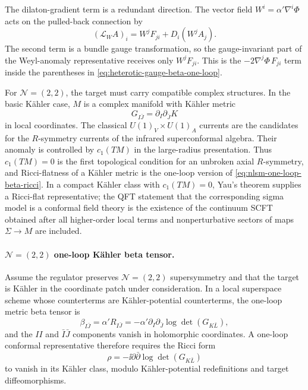 The dilaton-gradient term is a redundant direction.  The vector field
\(W^i=\alpha'\nabla^i\Phi\) acts on the pulled-back connection by
\[
  (\mathcal L_WA)_i
  =
  W^jF_{ji}+D_i(W^jA_j).
\]
The second term is a bundle gauge transformation, so the gauge-invariant
part of the Weyl-anomaly representative receives only \(W^jF_{ji}\).  This
is the \(-2\nabla^j\Phi\,F_{ji}\) term inside the parentheses in
\eqref{eq:heterotic-gauge-beta-one-loop}.

For \(\mathcal N=(2,2)\), the target must carry compatible complex structures.
In the basic K\"ahler case, \(M\) is a complex manifold with K\"ahler metric
\[
  G_{I\bar J}=\partial_I\partial_{\bar J}K
\]
in local coordinates.  The classical \(U(1)_V\times U(1)_A\) currents are
the candidates for the \(R\)-symmetry currents of the infrared
superconformal algebra.  Their anomaly is controlled by \(c_1(TM)\) in the
large-radius presentation.  Thus \(c_1(TM)=0\) is the first topological
condition for an unbroken axial \(R\)-symmetry, and Ricci-flatness of a
K\"ahler metric is the one-loop version of
\eqref{eq:nlsm-one-loop-beta-ricci}.  In a compact K\"ahler class with
\(c_1(TM)=0\), Yau's theorem supplies a Ricci-flat representative; the QFT
statement that the corresponding sigma model is a conformal field theory is
the existence of the continuum SCFT obtained after all higher-order local
terms and nonperturbative sectors of maps \(\Sigma\to M\) are included.

\paragraph{\(\mathcal N=(2,2)\) one-loop K\"ahler beta tensor.}
Assume the regulator preserves \(\mathcal N=(2,2)\) supersymmetry and that
the target is K\"ahler in the coordinate patch under consideration.  In a
local superspace scheme whose counterterms are K\"ahler-potential
counterterms, the one-loop metric beta tensor is
\begin{equation}
  \beta_{I\bar J}
  =
  \alpha' R_{I\bar J}
  =
  -\alpha'\partial_I\partial_{\bar J}\log\det(G_{K\bar L}),
  \label{eq:n22-kahler-one-loop-beta}
\end{equation}
and the \(II\) and \(\bar I\bar J\) components vanish in holomorphic
coordinates.  A one-loop conformal representative therefore requires the
Ricci form
\[
  \rho=-\ii\partial\bar\partial\log\det(G_{K\bar L})
\]
to vanish in its K\"ahler class, modulo K\"ahler-potential redefinitions and
target diffeomorphisms.

